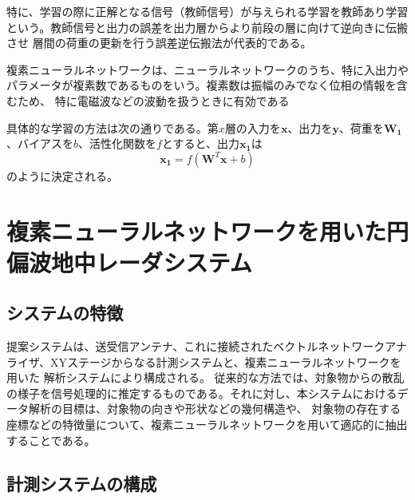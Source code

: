 \documentclass[11pt,a4paper,uplatex,draft]{ujarticle}
\begin{document}
    特に、学習の際に正解となる信号（教師信号）が与えられる学習を教師あり学習という。教師信号と出力の誤差を出力層からより前段の層に向けて逆向きに伝搬させ
    層間の荷重の更新を行う誤差逆伝搬法が代表的である。

    複素ニューラルネットワークは、ニューラルネットワークのうち、特に入出力やパラメータが複素数であるものをいう。複素数は振幅のみでなく位相の情報を含むため、
    特に電磁波などの波動を扱うときに有効である\cite{CVNN}

    具体的な学習の方法は次の通りである。第$x$層の入力を$\bm{x}$、出力を$\bm{y}$、荷重を$\bm{W_1}$、バイアスを$b$、活性化関数を$f$とすると、出力$\bm{x_1}$は
    \begin{equation}
      \bm{x_1} = f(\bm{W}^T\bm{x} + b)
    \end{equation}
    のように決定される。



\section{複素ニューラルネットワークを用いた円偏波地中レーダシステム}

  
  \subsection{システムの特徴}
    
    提案システムは、送受信アンテナ、これに接続されたベクトルネットワークアナライザ、XYステージからなる計測システムと、複素ニューラルネットワークを用いた
    解析システムにより構成される。
    従来的な方法では、対象物からの散乱の様子を信号処理的に推定するものである。それに対し、本システムにおけるデータ解析の目標は、対象物の向きや形状などの幾何構造や、
    対象物の存在する座標などの特徴量について、複素ニューラルネットワークを用いて適応的に抽出することである。

  \subsection{計測システムの構成}
\end{document}
